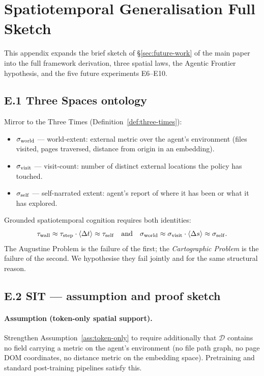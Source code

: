 
\section{Spatiotemporal Generalisation Full Sketch}
\label{app:spatiotemporal}

This appendix expands the brief sketch of \S\ref{sec:future-work} of the main paper into the full framework derivation, three spatial laws, the Agentic Frontier hypothesis, and the five future experiments E6--E10.

\subsection*{E.1 Three Spaces ontology}

Mirror to the Three Times (Definition~\ref{def:three-times}):

\begin{itemize}[leftmargin=*]
    \item $\sigma_{\mathrm{world}}$ --- world-extent: external metric over the agent's environment (files visited, pages traversed, distance from origin in an embedding).
    \item $\sigma_{\mathrm{visit}}$ --- visit-count: number of distinct external locations the policy has touched.
    \item $\sigma_{\mathrm{self}}$ --- self-narrated extent: agent's report of where it has been or what it has explored.
\end{itemize}

Grounded spatiotemporal cognition requires both identities:
\[
\tau_{\mathrm{wall}} \approx \tau_{\mathrm{step}} \cdot \langle\Delta t\rangle \approx \tau_{\mathrm{self}} \quad \text{and} \quad \sigma_{\mathrm{world}} \approx \sigma_{\mathrm{visit}} \cdot \langle\Delta s\rangle \approx \sigma_{\mathrm{self}}.
\]
The Augustine Problem is the failure of the first; the \emph{Cartographic Problem} is the failure of the second. We hypothesise they fail jointly and for the same structural reason.

\subsection*{E.2 SIT --- assumption and proof sketch}

\paragraph{Assumption (token-only spatial support).}
\label{ass:token-only-spatial}
Strengthen Assumption~\ref{ass:token-only} to require additionally that $\mathcal{D}$ contains no field carrying a metric on the agent's environment (no file path graph, no page DOM coordinates, no distance metric on the embedding space). Pretraining and standard post-training pipelines satisfy this.

